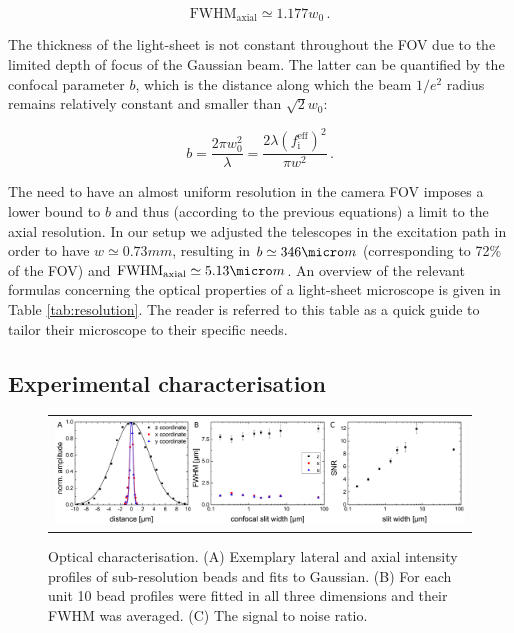 \documentclass[12pt]{spieman}  %
\begin{document}
\begin{equation}
\text{FWHM}_{\text{axial}} \simeq 1.177 w_0 \, .
\end{equation}

The thickness of the light-sheet is not constant throughout the FOV due to the limited depth of focus of the Gaussian beam. The latter can be quantified by the confocal parameter $b$, which is the distance along which the beam $1/e^2$ radius remains relatively constant and smaller than $\sqrt{2} w_0$:

\begin{equation}
b = \frac{2\pi w_0^2}{\lambda} = \frac{2 \lambda  {(f_{\text{i}}^{\text{eff}})}^2}{\pi w^2}\, .
\end{equation}

The need to have an almost uniform resolution in the camera FOV imposes a lower bound to $b$ and thus (according to the previous equations) a limit to the axial resolution. In our setup we adjusted the telescopes in the excitation path in order to have $w \simeq 0.73 mm$, resulting in $b \simeq 346 \micro m$ (corresponding to 72\% of the FOV) and $\text{FWHM}_{\text{axial}} \simeq 5.13 \micro m$. An overview of the relevant formulas concerning the optical properties of a light-sheet microscope is given in Table \ref{tab:resolution}. The reader is referred to this table as a quick guide to tailor their microscope to their specific needs.

\subsection{Experimental characterisation}

\begin{figure}
   \begin{center}
   \begin{tabular}{c}
   \includegraphics[width=\textwidth]{origin.eps}
   \end{tabular}
   \end{center}
   \caption{\label{fig:origin} Optical characterisation. (A) Exemplary lateral and axial intensity profiles of sub-resolution beads and fits to Gaussian. (B) For each unit 10 bead profiles were fitted in all three dimensions and their FWHM was averaged. (C) The signal to noise ratio.} 
\end{figure}
\end{document}
